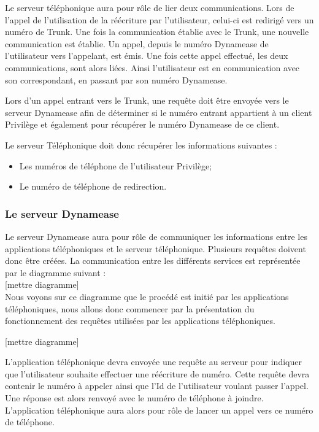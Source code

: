 Le serveur téléphonique aura pour rôle de lier deux communications. Lors de l'appel de l'utilisation de la réécriture par l'utilisateur, celui-ci est redirigé vers un numéro de Trunk. Une fois la communication établie avec le Trunk, une nouvelle communication est établie. Un appel, depuis le numéro Dynamease de l'utilisateur vers l'appelant, est émis. Une fois cette appel effectué, les deux communications, sont alors liées. Ainsi l'utilisateur est en communication avec son correspondant, en passant par son numéro Dynamease.

Lors d'un appel entrant vers le Trunk, une requête doit être envoyée vers le serveur Dynamease afin de déterminer si le numéro entrant appartient à un client Privilège et également pour récupérer le numéro Dynamease de ce client.

Le serveur Téléphonique doit donc récupérer les informations suivantes :

\begin{itemize}
	\item Les numéros de téléphone de l'utilisateur Privilège;
	\item Le numéro de téléphone de redirection.
\end{itemize}
 

\subsubsection{Le serveur Dynamease}

Le serveur Dynamease aura pour rôle de communiquer les informations entre les applications téléphoniques et le serveur téléphonique. Plusieurs requêtes doivent donc être créées. La communication entre les différents services est représentée par le diagramme suivant :\\

[mettre diagramme]\\

Nous voyons sur ce diagramme que le procédé est initié par les applications téléphoniques, nous allons donc commencer par la présentation du fonctionnement des requêtes utilisées par les applications téléphoniques.

[mettre diagramme]

L'application téléphonique devra envoyée une requête au serveur pour indiquer que l'utilisateur souhaite effectuer une réécriture de numéro. Cette requête devra contenir le numéro à appeler ainsi que l'Id de l'utilisateur voulant passer l'appel. Une réponse est alors renvoyé avec le numéro de téléphone à joindre. L'application téléphonique aura alors pour rôle de lancer un appel vers ce numéro de téléphone. 

